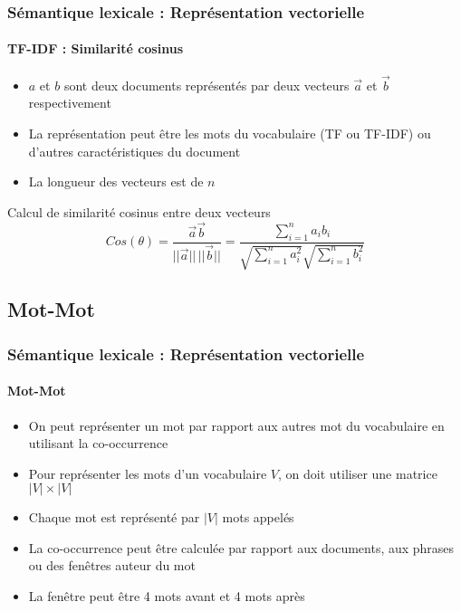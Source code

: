 \documentclass[xcolor=table]{beamer}
\begin{document}
\begin{frame}
\frametitle{Sémantique lexicale : Représentation vectorielle}
\framesubtitle{TF-IDF : Similarité cosinus}

\begin{minipage}{.68\textwidth}
\begin{itemize}
	\item $a$ et $b$ sont deux documents représentés par deux vecteurs $\overrightarrow{a}$ et $\overrightarrow{b}$ respectivement
	\item La représentation peut être les mots du vocabulaire (TF ou TF-IDF) ou d'autres caractéristiques du document
	\item La longueur des vecteurs est de $n$
\end{itemize}
\end{minipage}
\begin{minipage}{.3\textwidth}
\end{minipage}

\begin{block}{Calcul de similarité cosinus entre deux vecteurs}
	\[
	Cos(\theta) = \frac{\overrightarrow{a} \overrightarrow{b}}{||\overrightarrow{a}||\, ||\overrightarrow{b}||}
	= \frac{\sum_{i=1}^{n} a_i b_i}{\sqrt{\sum_{i=1}^{n} a_i^2} \sqrt{\sum_{i=1}^{n} b_i^2}}
	\]
\end{block}

\end{frame}

\subsection{Mot-Mot}

\begin{frame}
\frametitle{Sémantique lexicale : Représentation vectorielle}
\framesubtitle{Mot-Mot}

\begin{itemize}
	\item On peut représenter un mot par rapport aux autres mot du vocabulaire en utilisant la co-occurrence
	\item Pour représenter les mots d'un vocabulaire $ V $, on doit utiliser une matrice $|V| \times |V|$
	\item Chaque mot est représenté par $|V|$ mots appelés 
	\item La co-occurrence peut être calculée par rapport aux documents, aux phrases ou des fenêtres auteur du mot
	\item La fenêtre peut être 4 mots avant et 4 mots après
\end{itemize}

\end{frame}
\end{document}
